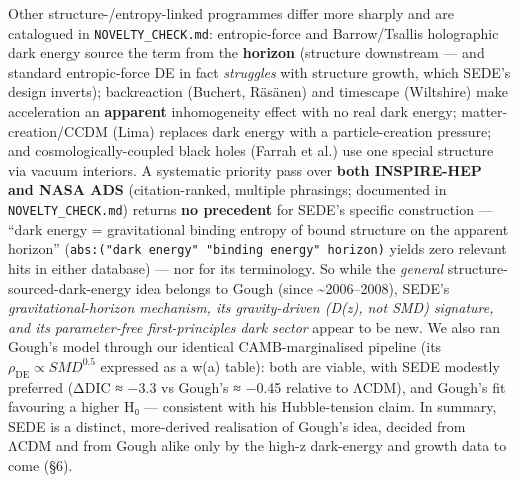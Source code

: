 \documentclass[
  10pt,
]{article}
\begin{document}
Other structure-/entropy-linked programmes differ more sharply and are
catalogued in \texttt{NOVELTY\_CHECK.md}: entropic-force and
Barrow/Tsallis holographic dark energy source the term from the
\textbf{horizon} (structure downstream --- and standard entropic-force
DE in fact \emph{struggles} with structure growth, which SEDE's design
inverts); backreaction (Buchert, Räsänen) and timescape (Wiltshire) make
acceleration an \textbf{apparent} inhomogeneity effect with no real dark
energy; matter-creation/CCDM (Lima) replaces dark energy with a
particle-creation pressure; and cosmologically-coupled black holes
(Farrah et al.) use one special structure via vacuum interiors. A
systematic priority pass over \textbf{both INSPIRE-HEP and NASA ADS}
(citation-ranked, multiple phrasings; documented in
\texttt{NOVELTY\_CHECK.md}) returns \textbf{no precedent} for SEDE's
specific construction --- ``dark energy = gravitational binding entropy
of bound structure on the apparent horizon''
(\texttt{abs:("dark\ energy"\ "binding\ energy"\ horizon)} yields zero
relevant hits in either database) --- nor for its terminology. So while
the \emph{general} structure-sourced-dark-energy idea belongs to Gough
(since \textasciitilde2006--2008), SEDE's \emph{gravitational-horizon
mechanism, its gravity-driven (D(z), not SMD) signature, and its
parameter-free first-principles dark sector} appear to be new. We also
ran Gough's model through our identical CAMB-marginalised pipeline (its
\(\rho _{\mathrm{DE}} \propto  SMD^{0.5}\) expressed as a w(a) table):
both are viable, with SEDE modestly preferred (ΔDIC ≈ −3.3 vs Gough's ≈
−0.45 relative to ΛCDM), and Gough's fit favouring a higher H₀ ---
consistent with his Hubble-tension claim. In summary, SEDE is a
distinct, more-derived realisation of Gough's idea, decided from ΛCDM
and from Gough alike only by the high-z dark-energy and growth data to
come (§6).
\end{document}
